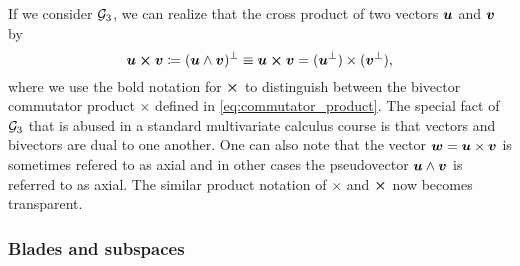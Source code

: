 \begin{remark}
\label{rem:cross_product}
If we consider $\mathcal{G}_3$, we can realize that the cross product of two vectors $\boldsymbol{u}$ and $\boldsymbol{v}$ by
\begin{equation}
\boldsymbol{u} \boldsymbol{\times} \boldsymbol{v} \coloneqq (\boldsymbol{u}\wedge \boldsymbol{v})^\perp
\equiv \boldsymbol{u} \boldsymbol{\times} \boldsymbol{v} = (\boldsymbol{u}^\perp)\times (\boldsymbol{v}^\perp), 
\end{equation}
where we use the bold notation for $\boldsymbol{\times}$ to distinguish between the bivector commutator product $\times$ defined in \cref{eq:commutator_product}. The special fact of $\mathcal{G}_3$ that is abused in a standard multivariate calculus course is that vectors and bivectors are dual to one another. One can also note that the vector $\boldsymbol{w}=\boldsymbol{u}\times \boldsymbol{v}$ is sometimes refered to as axial and in other cases the pseudovector $\boldsymbol{u}\wedge \boldsymbol{v}$ is referred to as axial. The similar product notation of $\times$ and $\boldsymbol{\times}$ now becomes transparent. 
\end{remark}


\subsubsection{Blades and subspaces}

